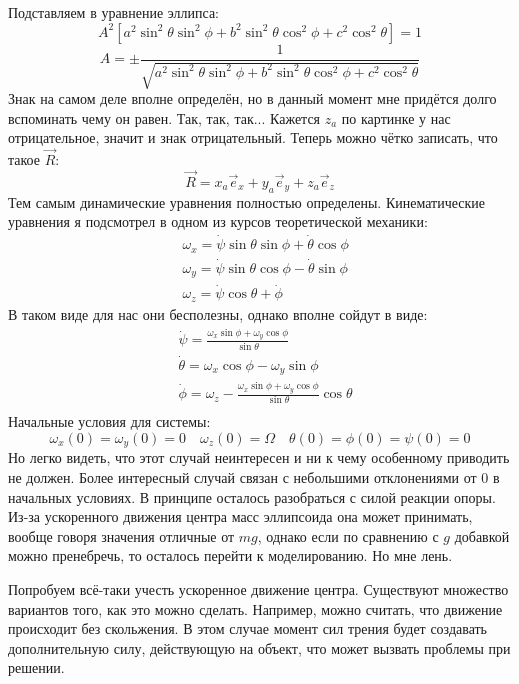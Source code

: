 Подставляем в уравнение эллипса:
\[
	A^2[a^2\sin^2 \theta \sin^2 \phi + b^2\sin^2 \theta \cos^2 \phi + c^2\cos^2 \theta] = 1
\]
\[
	A = \pm \frac{1}{\sqrt{a^2\sin^2 \theta \sin^2 \phi + b^2\sin^2 \theta \cos^2 \phi + c^2\cos^2 \theta}}
\]
Знак на самом деле вполне определён, но в данный момент мне придётся долго вспоминать чему он равен. Так, так, так... Кажется $z_a$ по картинке у нас отрицательное, значит и знак отрицательный. Теперь можно чётко записать, что такое $\vec{R}$:
\[
	\vec{R} = x_a \vec{e}_x + y_a \vec{e}_y + z_a \vec{e}_z
\]
Тем самым динамические уравнения полностью определены. Кинематические уравнения я подсмотрел в одном из курсов теоретической механики:
\[
	\begin{aligned}
	& \omega_x = \dot{\psi} \sin \theta \sin \phi + \dot{\theta} \cos \phi \\
	& \omega_y = \dot{\psi} \sin \theta \cos \phi - \dot{\theta} \sin \phi \\
	& \omega_z = \dot{\psi} \cos \theta + \dot{\phi}
	\end{aligned}
\]
В таком виде для нас они бесполезны, однако вполне сойдут в виде:
\[
	\begin{aligned}
	& \dot{\psi} = \frac{\omega_x \sin \phi + \omega_y \cos \phi}{\sin \theta} \\
	& \dot{\theta} = \omega_x \cos \phi - \omega_y \sin \phi \\
	& \dot{\phi} = \omega_z - \frac{\omega_x \sin \phi + \omega_y \cos \phi}{\sin \theta} \cos \theta \\
	\end{aligned}
\]
Начальные условия для системы:
\[
	\omega_x(0) = \omega_y(0) = 0
	\quad
	\omega_z(0) = \Omega 
	\quad
	\theta(0) = \phi(0) = \psi(0) = 0 
\]
Но легко видеть, что этот случай неинтересен и ни к чему особенному приводить не должен. Более интересный случай связан с небольшими отклонениями от 0 в начальных условиях. В принципе осталось разобраться с силой реакции опоры. Из-за ускоренного движения центра масс эллипсоида она может принимать, вообще говоря значения отличные от $mg$, однако если по сравнению с $g$ добавкой можно пренебречь, то осталось перейти к моделированию. Но мне лень.

Попробуем всё-таки учесть ускоренное движение центра. Существуют множество вариантов того, как это можно сделать. Например, можно считать, что движение происходит без скольжения. В этом случае момент сил трения будет создавать дополнительную силу, действующую на объект, что может вызвать проблемы при решении.


